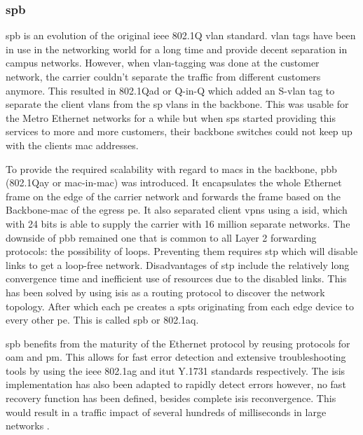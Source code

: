 \subsubsection{\acs{spb}} %
\label{ssub:spb}

\ac{spb} is an evolution of the original \acs{ieee} 802.1Q \ac{vlan} standard. \ac{vlan} tags have been in use in the networking world for a long time and provide decent separation in campus networks. However, when \ac{vlan}-tagging was done at the customer network, the carrier couldn't separate the traffic from different customers anymore. This resulted in 802.1Qad or Q-in-Q which added an S-\ac{vlan} tag to separate the client \acp{vlan} from the \ac{sp} \acp{vlan} in the backbone. This was usable for the Metro Ethernet networks for a while but when \acp{sp} started providing this services to more and more customers, their backbone switches could not keep up with the clients \ac{mac} addresses.

To provide the required scalability with regard to \acp{mac} in the backbone, \ac{pbb} (802.1Qay or \ac{mac}-in-\ac{mac}) was introduced. It encapsulates the whole Ethernet frame on the edge of the carrier network and forwards the frame based on the Backbone-\ac{mac} of the egress \ac{pe}. It also separated client \acp{vpn} using a \ac{isid}, which with 24 bits is able to supply the carrier with 16 million separate networks. The downside of \ac{pbb} remained one that is common to all Layer 2 forwarding protocols: the possibility of loops. Preventing them requires \ac{stp} which will disable links to get a loop-free network. Disadvantages of \ac{stp} include the relatively long convergence time and inefficient use of resources due to the disabled links. This has been solved by using \acs{isis} as a routing protocol to discover the network topology. After which each \ac{pe} creates a \acp{spt} originating from each edge device to every other \ac{pe}. This is called \ac{spb} or 802.1aq.

\ac{spb} benefits from the maturity of the Ethernet protocol by reusing protocols for \ac{oam} and \ac{pm}. This allows for fast error detection and extensive troubleshooting tools by using the \ac{ieee} 802.1ag and \ac{itut} Y.1731 standards respectively. The \ac{isis} implementation has also been adapted to rapidly detect errors however, no fast recovery function has been defined, besides complete \ac{isis} reconvergence. This would result in a traffic impact of several hundreds of milliseconds in large networks \cite{spb-nanog}. 

